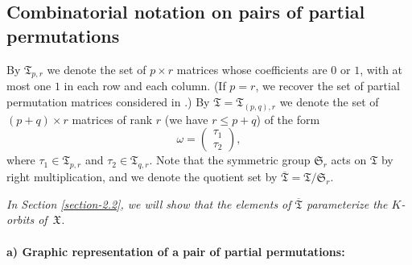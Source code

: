 \documentclass[ALCO,Unicode]{cedram}
\newcommand{\permutationsof}[1]{\mathfrak{S}_{#1}}
\newcommand{\ppermutationsof}{\mathfrak{T}}
\newcommand{\parameters}{\overline{\ppermutationsof}}
\newcommand{\Xfv}{\mathfrak{X}}
\begin{document}
\subsection{Combinatorial notation on pairs of partial permutations}

\label{section-2.1}

By $\ppermutationsof_{p,r}$ we denote the set of $p\times r$ matrices whose coefficients are $0$ or $1$, with at most one $1$ in each row and each column.
(If $p=r$, we recover the set of partial permutation matrices considered in \cite{FN2}.)
By $\ppermutationsof=\ppermutationsof_{(p,q),r}$ we denote the set of $(p+q)\times r$ matrices of rank $r$ (we have $r\leq p+q$) of the form
\[\omega=\begin{pmatrix} \tau_1\\ \tau_2 \end{pmatrix},\]
where $\tau_1\in\ppermutationsof_{p,r}$ and $\tau_2\in\ppermutationsof_{q,r}$.
Note that the symmetric group $\permutationsof{r}$ acts on $\ppermutationsof$ by right multiplication, and we denote the quotient set by $\parameters=\ppermutationsof/\permutationsof{r}$.

{\em In Section \ref{section-2.2}, we will show that the elements of $\parameters$ parameterize the $K$-orbits of~$\Xfv$.}


\paragraph{\bf a) Graphic representation of a pair of partial permutations:}\
\end{document}
